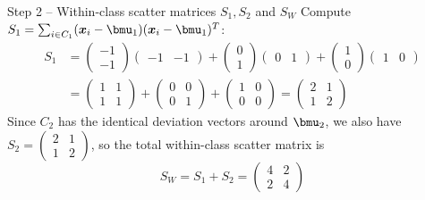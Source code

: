 \documentclass[aspectratio=169]{beamer}\usepackage[]{graphicx}\usepackage[]{xcolor}
\begin{document}
\begin{frame}{Step 2 -- Within-class scatter matrices $S_1, S_2$ and $S_W$}
    Compute $S_1 = \sum_{i \in C_1} (\bx_i - \bmu_1)(\bx_i - \bmu_1)^T$:
    \begin{align*}
        S_1 &= \begin{pmatrix} -1 \\ -1 \end{pmatrix}\begin{pmatrix} -1 & -1 \end{pmatrix}
             + \begin{pmatrix} 0 \\ 1 \end{pmatrix}\begin{pmatrix} 0 & 1 \end{pmatrix}
             + \begin{pmatrix} 1 \\ 0 \end{pmatrix}\begin{pmatrix} 1 & 0 \end{pmatrix} \\
            &= \begin{pmatrix} 1 & 1 \\ 1 & 1 \end{pmatrix}
             + \begin{pmatrix} 0 & 0 \\ 0 & 1 \end{pmatrix}
             + \begin{pmatrix} 1 & 0 \\ 0 & 0 \end{pmatrix}
             = \begin{pmatrix} 2 & 1 \\ 1 & 2 \end{pmatrix}
    \end{align*}
    \vfill
    Since $C_2$ has the identical deviation vectors around $\bmu_2$, we also have $S_2 = \begin{pmatrix} 2 & 1 \\ 1 & 2 \end{pmatrix}$, so the total within-class scatter matrix is
    \[
        S_W = S_1 + S_2 = \begin{pmatrix} 4 & 2 \\ 2 & 4 \end{pmatrix}
    \]
\end{frame}
\end{document}

